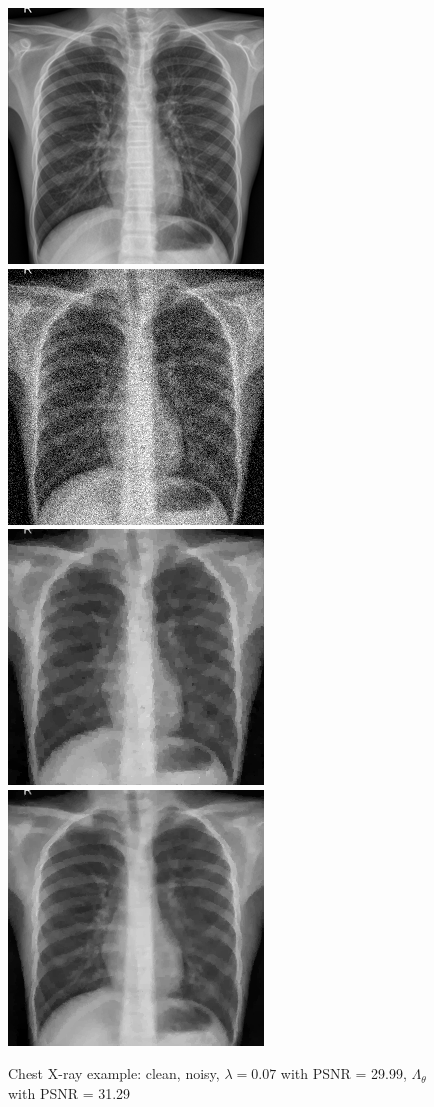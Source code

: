 \documentclass[12pt]{article}
\begin{document}
\begin{figure}[h]
  \centering
  \includegraphics[width=0.34\linewidth]{images//chest_xray/ex_31/clean.png}
  \includegraphics[width=0.34\linewidth]{images//chest_xray/ex_31/noisy.png}
  \includegraphics[width=0.34\linewidth]{images//chest_xray/ex_31/psnr_29.99-lambda_0.07.png}
  \includegraphics[width=0.34\linewidth]{images//chest_xray/ex_31/denoised-mse_48.71-psnr_31.29-ssim_0.83.png}
  \caption{Chest X-ray example: clean, noisy, $\lambda = 0.07$ with PSNR = 29.99, $\Lambda_\theta$ with PSNR = 31.29}
  \label{fig:enter-label}
\end{figure}
\end{document}

